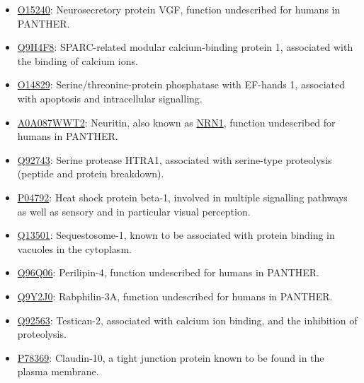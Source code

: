 \begin{itemize}
\item \href{http://www.pantherdb.org/genes/gene.do?acc=HUMAN\%7CHGNC\%3D12684\%7CUniProtKB\%3DO15240}{O15240}: Neurosecretory protein VGF, function undescribed for humans in PANTHER.
\item \href{http://www.pantherdb.org/genes/gene.do?acc=HUMAN\%7CHGNC\%3D20318\%7CUniProtKB\%3DQ9H4F8}{Q9H4F8}: SPARC-related modular calcium-binding protein 1, associated with the binding of calcium ions.
\item \href{http://www.pantherdb.org/genes/gene.do?acc=HUMAN\%7CHGNC\%3D9243\%7CUniProtKB\%3DO14829}{O14829}: Serine/threonine-protein phosphatase with EF-hands 1, associated with apoptosis and intracellular signalling.
\item \href{http://www.pantherdb.org/genes/gene.do?acc=HUMAN\%7CHGNC\%3D17972\%7CUniProtKB\%3DQ9NPD7}{A0A087WWT2}: Neuritin, also known as \href{https://www.uniprot.org/uniprot/A0A087WWT2}{NRN1}, function undescribed for humans in PANTHER.
\item \href{http://www.pantherdb.org/genes/gene.do?acc=HUMAN\%7CHGNC\%3D9476\%7CUniProtKB\%3DQ92743}{Q92743}: Serine protease HTRA1, associated with serine-type proteolysis (peptide and protein breakdown).
\item \href{http://www.pantherdb.org/genes/gene.do?acc=HUMAN\%7CHGNC\%3D5246\%7CUniProtKB\%3DP04792}{P04792}: Heat shock protein beta-1, involved in multiple signalling pathways as well as sensory and in particular visual perception.
\item \href{http://www.pantherdb.org/genes/gene.do?acc=HUMAN\%7CHGNC\%3D11280\%7CUniProtKB\%3DQ13501}{Q13501}: Sequestosome-1, known to be associated with protein binding in vacuoles in the cytoplasm.
\item \href{http://www.pantherdb.org/genes/gene.do?acc=HUMAN\%7CHGNC\%3D29393\%7CUniProtKB\%3DQ96Q06}{Q96Q06}: Perilipin-4, function undescribed for humans in PANTHER.
\item \href{http://www.pantherdb.org/genes/gene.do?acc=HUMAN\%7CHGNC\%3D17056\%7CUniProtKB\%3DQ9Y2J0}{Q9Y2J0}: Rabphilin-3A, function undescribed for humans in PANTHER.
\item \href{http://www.pantherdb.org/genes/gene.do?acc=HUMAN\%7CHGNC\%3D13564\%7CUniProtKB\%3DQ92563}{Q92563}: Testican-2, associated with calcium ion binding, and the inhibition of proteolysis.
\item \href{http://www.pantherdb.org/genes/gene.do?acc=HUMAN\%7CHGNC\%3D2033\%7CUniProtKB\%3DP78369}{P78369}: Claudin-10,  a tight junction protein known to be found in the plasma membrane.

\end{itemize}
